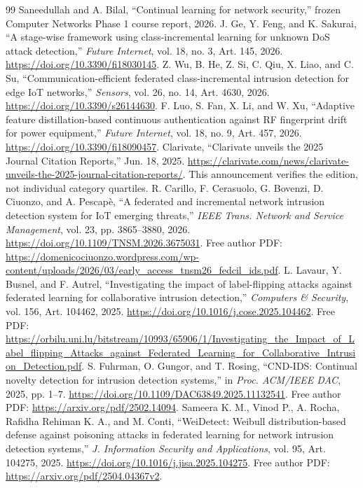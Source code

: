 \documentclass[10pt,a4paper]{article}
\begin{document}
\begin{thebibliography}{99}
 Saneedullah and A. Bilal, ``Continual learning for network security,'' frozen Computer Networks Phase 1 course report, 2026.
 J. Ge, Y. Feng, and K. Sakurai, ``A stage-wise framework using class-incremental learning for unknown DoS attack detection,'' \emph{Future Internet}, vol. 18, no. 3, Art. 145, 2026. \url{https://doi.org/10.3390/fi18030145}.
 Z. Wu, B. He, Z. Si, C. Qiu, X. Liao, and C. Su, ``Communication-efficient federated class-incremental intrusion detection for edge IoT networks,'' \emph{Sensors}, vol. 26, no. 14, Art. 4630, 2026. \url{https://doi.org/10.3390/s26144630}.
 F. Luo, S. Fan, X. Li, and W. Xu, ``Adaptive feature distillation-based continuous authentication against RF fingerprint drift for power equipment,'' \emph{Future Internet}, vol. 18, no. 9, Art. 457, 2026. \url{https://doi.org/10.3390/fi18090457}.
 Clarivate, ``Clarivate unveils the 2025 Journal Citation Reports,'' Jun. 18, 2025. \url{https://clarivate.com/news/clarivate-unveils-the-2025-journal-citation-reports/}. This announcement verifies the edition, not individual category quartiles.
 R. Carillo, F. Cerasuolo, G. Bovenzi, D. Ciuonzo, and A. Pescap\`e, ``A federated and incremental network intrusion detection system for IoT emerging threats,'' \emph{IEEE Trans. Network and Service Management}, vol. 23, pp. 3865--3880, 2026. \url{https://doi.org/10.1109/TNSM.2026.3675031}. Free author PDF: \url{https://domenicociuonzo.wordpress.com/wp-content/uploads/2026/03/early_access_tnsm26_fedcil_ids.pdf}.
 L. Lavaur, Y. Busnel, and F. Autrel, ``Investigating the impact of label-flipping attacks against federated learning for collaborative intrusion detection,'' \emph{Computers \& Security}, vol. 156, Art. 104462, 2025. \url{https://doi.org/10.1016/j.cose.2025.104462}. Free PDF: \url{https://orbilu.uni.lu/bitstream/10993/65906/1/Investigating_the_Impact_of_Label_flipping_Attacks_against_Federated_Learning_for_Collaborative_Intrusion_Detection.pdf}.
 S. Fuhrman, O. Gungor, and T. Rosing, ``CND-IDS: Continual novelty detection for intrusion detection systems,'' in \emph{Proc. ACM/IEEE DAC}, 2025, pp. 1--7. \url{https://doi.org/10.1109/DAC63849.2025.11132541}. Free author PDF: \url{https://arxiv.org/pdf/2502.14094}.
 Sameera K. M., Vinod P., A. Rocha, Rafidha Rehiman K. A., and M. Conti, ``WeiDetect: Weibull distribution-based defense against poisoning attacks in federated learning for network intrusion detection systems,'' \emph{J. Information Security and Applications}, vol. 95, Art. 104275, 2025. \url{https://doi.org/10.1016/j.jisa.2025.104275}. Free author PDF: \url{https://arxiv.org/pdf/2504.04367v2}.

\end{thebibliography}
\end{document}
